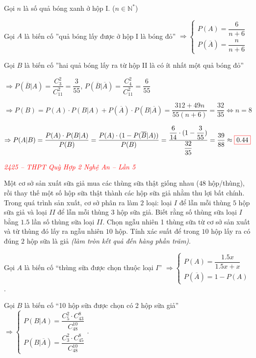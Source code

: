 \documentclass[twoside,final]{hcmut-report}
\newcommand{\exercise}[1]{\begin{exercisebox}#1\end{exercisebox}}
\newcommand{\result}[1]{\fcolorbox{red}{white}{#1}}
\begin{document}
Gọi $n$ là số quả bóng xanh ở hộp I. ($n\in\mathbb{N}^*$)\par
Gọi $A$ là biến cố ''quả bóng lấy được ở hộp I là bóng đỏ''
$\Rightarrow \begin{cases}
        P(A) = \dfrac{6}{n+6} \\
        P(\overline{A}) = \dfrac{n}{n+6}
    \end{cases}$\par
Gọi $B$ là biến cố ''hai quả bóng lấy ra từ hộp II là có ít nhất một quả bóng đỏ''\par
$\Rightarrow P(\overline{B}|A) = \dfrac{\displaystyle C^2_3}{\displaystyle C^2_{11}} = \dfrac{3}{55}$, $P(\overline{B}|\overline{A}) = \dfrac{\displaystyle C^2_4}{\displaystyle C^2_{11}} = \dfrac{6}{55}$\par
$\Rightarrow P(B) = P(A)\cdot P(B|A) + P(\overline{A})\cdot P(B|\overline{A}) = \dfrac{312 + 49n}{55(n+6)} = \dfrac{32}{35} \Leftrightarrow n = 8$\par
$\Rightarrow P(A|B) = \dfrac{P(A)\cdot P(B|A)}{P(B)} = \dfrac{P(A)\cdot (1 - P(\overline{B}|A))}{P(B)} = \dfrac{\dfrac{6}{14}\cdot(1-\dfrac{3}{55})}{\dfrac{32}{35}} = \dfrac{39}{88} \approx \result{0.44}$\par
\exercise{
    \textcolor{red}{\textit{2425 -- THPT Quỳ Hợp 2 Nghệ An -- Lần 5}}

    Một cơ sở sản xuất sữa giả mua các thùng sữa thật giống nhau ($48$ hộp/thùng), rồi thay thế một số hộp sữa thật thành các hộp sữa giả nhằm thu lợi bất chính. Trong quá trình sản xuất, cơ sở phân ra làm $2$ loại: loại $I$ để lẫn mỗi thùng $5$ hộp sữa giả và loại $II$ để lẫn mỗi thùng $3$ hộp sữa giả. Biết rằng số thùng sữa loại $I$ bằng $1.5$ lần số thùng sữa loại $II$. Chọn ngẫu nhiên 1 thùng sữa từ cơ sở sản xuất và từ thùng đó lấy ra ngẫu nhiên $10$ hộp. Tính xác suất để trong $10$ hộp lấy ra có đúng $2$ hộp sữa là giả \textit{(làm tròn kết quả đến hàng phần trăm)}.}
Gọi $A$ là biến cố ``thùng sữa được chọn thuộc loại $I$'' $\Rightarrow \begin{cases}
        P(A) = \dfrac{1.5x}{1.5x + x} \\
        P(\overline{A}) = 1 - P(A)
    \end{cases}$.\par
Gọi $B$ là biến cố ``10 hộp sữa được chọn có 2 hộp sữa giả'' $\Rightarrow \begin{cases}
        P(B|A) = \dfrac{\displaystyle C^2_{5}\cdot C^{8}_{43}}{\displaystyle C^{10}_{48}} \\
        P(B|\overline{A}) = \dfrac{\displaystyle C^2_{3}\cdot C^{8}_{45}}{\displaystyle C^{10}_{48}}
    \end{cases}$.\par
\end{document}
